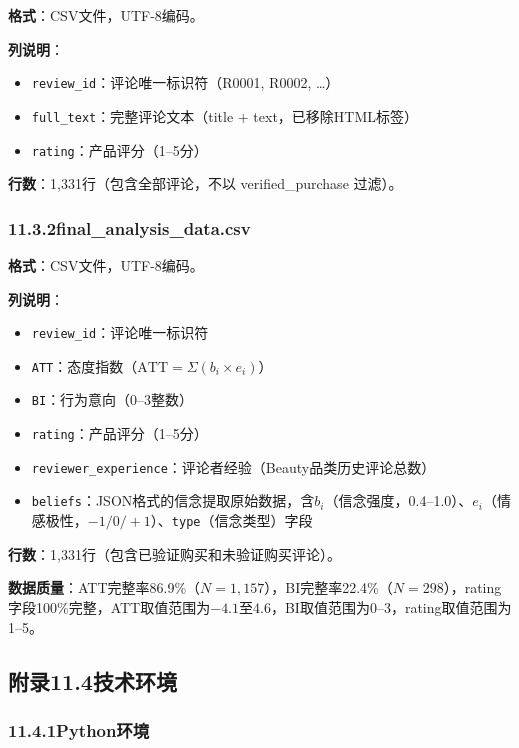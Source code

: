 \textbf{格式}：CSV文件，UTF-8编码。

\textbf{列说明}：
\begin{itemize}
  \item \texttt{review\_id}：评论唯一标识符（R0001, R0002, \ldots）
  \item \texttt{full\_text}：完整评论文本（title + text，已移除HTML标签）
  \item \texttt{rating}：产品评分（1--5分）
\end{itemize}

\textbf{行数}：1{,}331行（包含全部评论，不以 verified\_purchase 过滤）。

\subsubsection*{11.3.2\quad final\_analysis\_data.csv}

\textbf{格式}：CSV文件，UTF-8编码。

\textbf{列说明}：
\begin{itemize}
  \item \texttt{review\_id}：评论唯一标识符
  \item \texttt{ATT}：态度指数（$\text{ATT} = \Sigma(b_i \times e_i)$）
  \item \texttt{BI}：行为意向（0--3整数）
  \item \texttt{rating}：产品评分（1--5分）
  \item \texttt{reviewer\_experience}：评论者经验（Beauty品类历史评论总数）
  \item \texttt{beliefs}：JSON格式的信念提取原始数据，含$b_i$（信念强度，0.4--1.0）、$e_i$（情感极性，$-1/0/+1$）、\texttt{type}（信念类型）字段
\end{itemize}

\textbf{行数}：1{,}331行（包含已验证购买和未验证购买评论）。

\textbf{数据质量}：ATT完整率86.9\%（$N=1{,}157$），BI完整率22.4\%（$N=298$），rating字段100\%完整，ATT取值范围为$-4.1$至$4.6$，BI取值范围为0--3，rating取值范围为1--5。

\subsection*{附录11.4\quad 技术环境}

\subsubsection*{11.4.1\quad Python环境}


